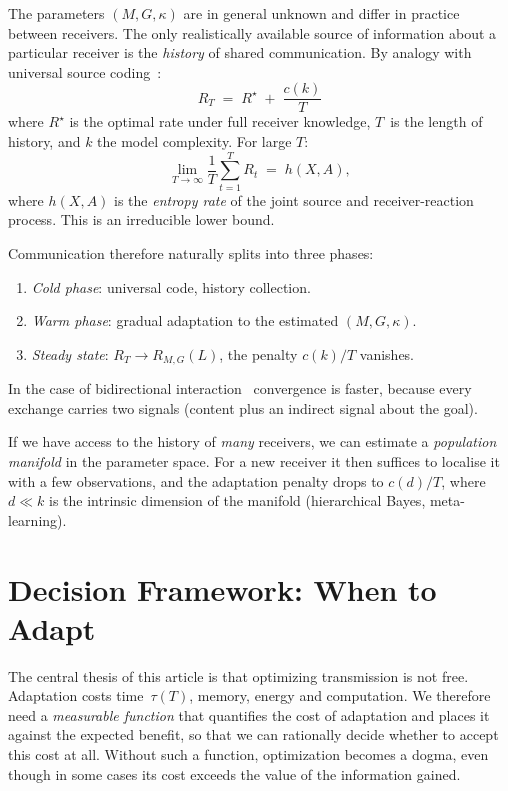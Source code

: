 \documentclass[11pt,a4paper]{article}
\begin{document}
The parameters $(M, G, \kappa)$ are in general unknown and differ in
practice between receivers. The only realistically available source
of information about a particular receiver is the \emph{history} of
shared communication. By analogy with universal source
coding~\cite{rissanen1978,lempelziv1977}:
\[
    R_T \;=\; R^\star \;+\; \frac{c(k)}{T}
\]
where $R^\star$ is the optimal rate under full receiver knowledge,
$T$~is the length of history, and $k$ the model complexity. For large
$T$:
\begin{equation}
    \lim_{T \to \infty} \frac{1}{T}\sum_{t=1}^T R_t \;=\; h(X, A),
    \label{eq:entropy-rate}
\end{equation}
where $h(X, A)$ is the \emph{entropy rate} of the joint source and
receiver-reaction process. This is an irreducible lower bound.

Communication therefore naturally splits into three phases:
\begin{enumerate}
    \item \emph{Cold phase}: universal code, history collection.
    \item \emph{Warm phase}: gradual adaptation to the estimated
          $(M, G, \kappa)$.
    \item \emph{Steady state}: $R_T \to R_{M,G}(L)$, the penalty
          $c(k)/T$ vanishes.
\end{enumerate}

In the case of bidirectional
interaction~\cite{kaspi1985,orlitsky1990} convergence is faster,
because every exchange carries two signals (content plus an indirect
signal about the goal).

If we have access to the history of \emph{many} receivers, we can
estimate a \emph{population manifold} in the parameter space. For a
new receiver it then suffices to localise it with a few observations,
and the adaptation penalty drops to $c(d)/T$, where $d \ll k$ is the
intrinsic dimension of the manifold (hierarchical Bayes,
meta-learning).

\section{Decision Framework: When to Adapt}

The central thesis of this article is that optimizing transmission is
not free. Adaptation costs time~$\tau(T)$, memory, energy and
computation. We therefore need a \emph{measurable function} that
quantifies the cost of adaptation and places it against the expected
benefit, so that we can rationally decide whether to accept this cost
at all. Without such a function, optimization becomes a dogma, even
though in some cases its cost exceeds the value of the information
gained.
\end{document}
